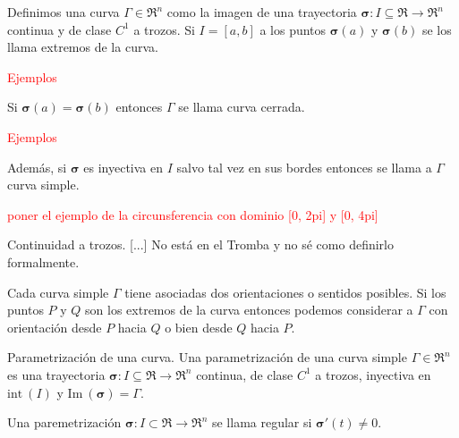 \begin{definition}
    Definimos una curva $\Gamma\in\Re^n$ como la imagen de una trayectoria $\boldsymbol{\sigma}:I\subseteq\Re\to\Re^n$ continua y de clase $C^1$ a trozos. Si $I=[a,b]$ a los puntos $\boldsymbol{\sigma}(a)$ y $\boldsymbol{\sigma}(b)$ se los llama extremos de la curva.

    \textcolor{red}{Ejemplos}

    Si $\boldsymbol{\sigma}(a)=\boldsymbol{\sigma}(b)$ entonces $\Gamma$ se llama curva cerrada.

    \textcolor{red}{Ejemplos}

    Adem\'as, si $\boldsymbol{\sigma}$ es inyectiva en $I$ salvo tal vez en sus bordes entonces se llama a $\Gamma$ curva simple.

    \textcolor{red}{poner el ejemplo de la circunsferencia con dominio [0, 2pi] y [0, 4pi]}
\end{definition}

\begin{definition}
    Continuidad a trozos. [...] No est\'a en el Tromba y no s\'e como definirlo formalmente.
\end{definition}

Cada curva simple $\Gamma$ tiene asociadas dos orientaciones o sentidos posibles. Si los puntos $P$ y $Q$ son los extremos de la curva entonces podemos considerar a $\Gamma$ con orientaci\'on desde $P$ hacia $Q$ o bien desde $Q$ hacia $P$.

\begin{definition}
    Parametrizaci\'on de una curva. Una parametrizaci\'on de una curva simple $\Gamma\in\Re^n$ es una trayectoria $\boldsymbol{\sigma}:I\subseteq\Re\to\Re^n$ continua, de clase $C^1$ a trozos, inyectiva en $\text{int}\:(I)$ y $\text{Im}\:(\boldsymbol{\sigma})=\Gamma$. 
\end{definition}

\begin{definition}
    Una paremetrizaci\'on $\boldsymbol{\sigma}:I\subset\Re\to\Re^n$ se llama regular si $\boldsymbol{\sigma}'(t)\neq0$.
\end{definition}